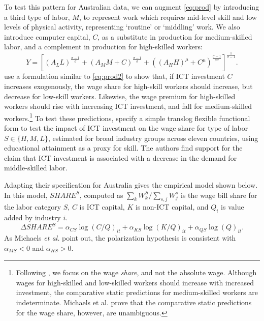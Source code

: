 To test this pattern for Australian data, we can augment \eqref{eq:prod} by introducing a third type of labor, $M$, to represent work which requires mid-level skill and low levels of physical activity, representing `routine' or `middling' work. We also introduce computer capital, $C$, as a substitute in production for medium-skilled labor, and a complement in production for high-skilled workers:
\begin{equation}  \label{eq:prod2}
Y = \left[
  \left(A_LL \right)^\frac{\sigma-1}{\sigma}
  +
  \left(A_MM + C\right)^\frac{\sigma-1}{\sigma}
  +
  \left((A_HH)^\mu + C^\mu\right)^\frac{\sigma-1}{\mu\sigma}
  \right]^\frac{1}{\sigma-1}.
\end{equation}
\citet{Michaels2010} use a formulation similar to \eqref{eq:prod2} to show that, if ICT investment $C$ increases exogenously, the wage share for high-skill workers should increase, but decrease for low-skill workers. Likewise, the wage premium for high-skilled workers should rise with increasing ICT investment, and fall for medium-skilled workers.\footnote{Following \citet{Michaels2010}, we focus on the wage {\em share}, and not the absolute wage. Although wages for high-skilled and low-skilled workers should increase with increased investment, the comparative static predictions for medium-skilled workers are indeterminate. Michaels et al. prove that the comparative static predictions for the wage share, however, are unambiguous.} To test these predictions, \citet{Michaels2010} specify a simple translog flexible functional form to test the impact of ICT investment on the wage share for type of labor $S\in\{H,M,L\}$, estimated for broad industry groups across eleven countries, using educational attainment as a proxy for skill. The authors find support for the claim that ICT investment is associated with a decrease in the demand for middle-skilled labor. 

Adapting their specification for Australia gives the empirical model shown below. In this model, $SHARE^S$, computed as ${\sum_k W^S_k/\sum_{s,j}W^s_j}$ is the wage bill share for the labor category $S$, $C$ is ICT capital, $K$ is non-ICT capital, and $Q_i$ is value added by industry $i$. 
\begin{equation} \label{eq:translog}
\Delta SHARE^S = \alpha_{CS}\log(C/Q)_{it} + \alpha_{KS}\log(K/Q)_{it} + \alpha_{QS}\log(Q)_{it}.
\end{equation}
As Michaels {\it et al.} point out, the polarization hypothesis is consistent with $\alpha_{MS}<0$ and $\alpha_{HS}>0$.

